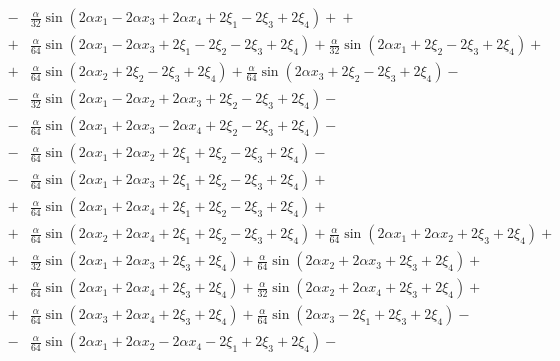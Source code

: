 \documentclass[11pt]{jfm}
\numberwithin{equation}{section}
\begin{document}
\begin{eqnarray}
&\!-\! &\frac{\alpha}{32} \sin(2\alpha x_1 \!-\! 2\alpha x_3 \!+\! 2\alpha x_4 \!+\! 2\xi_1 \!-\! 2\xi_3 \!+\! 2\xi_4)\!+\!
+ \nonumber\\
&\!+\!&\frac{\alpha}{64} \sin(2\alpha x_1 \!-\! 2\alpha x_3 \!+\! 2\xi_1 \!-\! 2\xi_2 \!-\! 2\xi_3 \!+\! 2\xi_4)\!+\! \frac{\alpha}{32} \sin(2\alpha x_1 \!+\! 2\xi_2 \!-\! 2\xi_3 \!+\! 2\xi_4)\!+\!\nonumber\\
&\!+\!& \frac{\alpha}{64} \sin(2\alpha x_2 \!+\! 2\xi_2 \!-\! 2\xi_3 \!+\! 2\xi_4)\!+\! \frac{\alpha}{64} \sin(2\alpha x_3 \!+\! 2\xi_2 \!-\! 2\xi_3 \!+\! 2\xi_4)\!-\!\nonumber\\
&\!-\!& \frac{\alpha}{32} \sin(2\alpha x_1 \!-\! 2\alpha x_2 \!+\! 2\alpha x_3 \!+\! 2\xi_2 \!-\! 2\xi_3 \!+\! 2\xi_4)\!-\! \nonumber\\
&\!-\!&\frac{\alpha}{64} \sin(2\alpha x_1 \!+\! 2\alpha x_3 \!-\! 2\alpha x_4 \!+\! 2\xi_2 \!-\! 2\xi_3 \!+\! 2\xi_4)\!-\!\nonumber\\
&\!-\!&  \frac{\alpha}{64} \sin(2\alpha x_1 \!+\! 2\alpha x_2 \!+\! 2\xi_1 \!+\! 2\xi_2 \!-\! 2\xi_3 \!+\! 2\xi_4)\!-\!\nonumber\\
&\!-\!&\frac{\alpha}{64} \sin(2\alpha x_1 \!+\! 2\alpha x_3 \!+\! 2\xi_1 \!+\! 2\xi_2 \!-\! 2\xi_3 \!+\! 2\xi_4)\!+\!\nonumber\\
&\!+\!& \frac{\alpha}{64} \sin(2\alpha x_1 \!+\! 2\alpha x_4 \!+\! 2\xi_1 \!+\! 2\xi_2 \!-\! 2\xi_3 \!+\! 2\xi_4)\!+\! \nonumber\\
&\!+\!& \frac{\alpha}{64} \sin(2\alpha x_2 \!+\! 2\alpha x_4 \!+\! 2\xi_1 \!+\! 2\xi_2 \!-\! 2\xi_3 \!+\! 2\xi_4)\!+\! \frac{\alpha}{64} \sin(2\alpha x_1 \!+\! 2\alpha x_2 \!+\! 2\xi_3 \!+\! 2\xi_4)\!+\!\nonumber\\
&\!+\!& \frac{\alpha}{32} \sin(2\alpha x_1 \!+\! 2\alpha x_3 \!+\! 2\xi_3 \!+\! 2\xi_4)\!+\! \frac{\alpha}{64} \sin(2\alpha x_2 \!+\! 2\alpha x_3 \!+\! 2\xi_3 \!+\! 2\xi_4)\!+\!\nonumber\\
&\!+\!& \frac{\alpha}{64} \sin(2\alpha x_1 \!+\! 2\alpha x_4 \!+\! 2\xi_3 \!+\! 2\xi_4)\!+\! \frac{\alpha}{32} \sin(2\alpha x_2 \!+\! 2\alpha x_4 \!+\! 2\xi_3 \!+\! 2\xi_4)\!+\!\nonumber\\
&\!+\!& \frac{\alpha}{64} \sin(2\alpha x_3 \!+\! 2\alpha x_4 \!+\! 2\xi_3 \!+\! 2\xi_4)\!+\! \frac{\alpha}{64} \sin(2\alpha x_3 \!-\! 2\xi_1 \!+\! 2\xi_3 \!+\! 2\xi_4)\!-\!\nonumber\\
&\!-\!& \frac{\alpha}{64} \sin(2\alpha x_1 \!+\! 2\alpha x_2 \!-\! 2\alpha x_4 \!-\! 2\xi_1 \!+\! 2\xi_3 \!+\! 2\xi_4)\!-\! \nonumber\\

\end{eqnarray}
\end{document}
